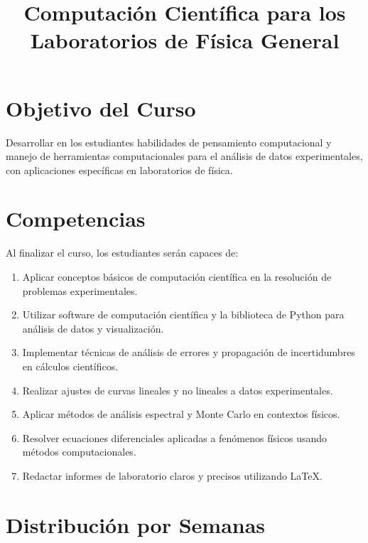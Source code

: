 \documentclass{article}
\title{Computación Científica para los Laboratorios de Física General}
\author{}
\date{}
\begin{document}
\maketitle

\section*{Objetivo del Curso}
Desarrollar en los estudiantes habilidades de pensamiento computacional y manejo de herramientas computacionales para el análisis de datos experimentales, con aplicaciones específicas en laboratorios de física.

\section*{Competencias}
Al finalizar el curso, los estudiantes serán capaces de:
\begin{enumerate}
    \item Aplicar conceptos básicos de computación científica en la resolución de problemas experimentales.
    \item Utilizar software de computación científica y la biblioteca de Python para análisis de datos y visualización.
    \item Implementar técnicas de análisis de errores y propagación de incertidumbres en cálculos científicos.
    \item Realizar ajustes de curvas lineales y no lineales a datos experimentales.
    \item Aplicar métodos de análisis espectral y Monte Carlo en contextos físicos.
    \item Resolver ecuaciones diferenciales aplicadas a fenómenos físicos usando métodos computacionales.
    \item Redactar informes de laboratorio claros y precisos utilizando LaTeX.
\end{enumerate}

\section*{Distribución por Semanas}
\end{document}
